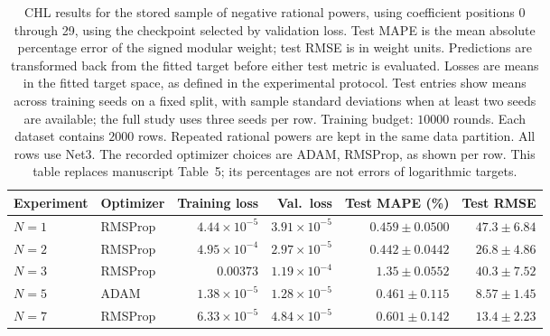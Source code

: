 \begin{table}[!htbp]
\centering
\small
\setlength{\tabcolsep}{4pt}
\renewcommand{\arraystretch}{1.18}
\begin{tabular}{@{}llrrrr@{}}
\toprule
Experiment & Optimizer & Training loss & Val.\ loss & Test MAPE (\%) & Test RMSE \\
\midrule
$N=1$ & RMSProp & $4.44\times10^{-5}$ & $3.91\times10^{-5}$ & $0.459\pm0.0500$ & $47.3\pm6.84$ \\
$N=2$ & RMSProp & $4.95\times10^{-4}$ & $2.97\times10^{-5}$ & $0.442\pm0.0442$ & $26.8\pm4.86$ \\
$N=3$ & RMSProp & $0.00373$ & $1.19\times10^{-4}$ & $1.35\pm0.0552$ & $40.3\pm7.52$ \\
$N=5$ & ADAM & $1.38\times10^{-5}$ & $1.28\times10^{-5}$ & $0.461\pm0.115$ & $8.57\pm1.45$ \\
$N=7$ & RMSProp & $6.33\times10^{-5}$ & $4.84\times10^{-5}$ & $0.601\pm0.142$ & $13.4\pm2.23$ \\
\bottomrule
\end{tabular}
\caption{\textsf{CHL results for the stored sample of negative rational powers, using coefficient positions 0 through 29, using the checkpoint selected by validation loss. Test MAPE is the mean absolute percentage error of the signed modular weight; test RMSE is in weight units. Predictions are transformed back from the fitted target before either test metric is evaluated. Losses are means in the fitted target space, as defined in the experimental protocol. Test entries show means across training seeds on a fixed split, with sample standard deviations when at least two seeds are available; the full study uses three seeds per row. Training budget: $10000$ rounds. Each dataset contains $2000$ rows. Repeated rational powers are kept in the same data partition. All rows use Net3. The recorded optimizer choices are ADAM, RMSProp, as shown per row. This table replaces manuscript Table~5; its percentages are not errors of logarithmic targets.}}
\label{tab:chl-revised-5-best}
\end{table}
